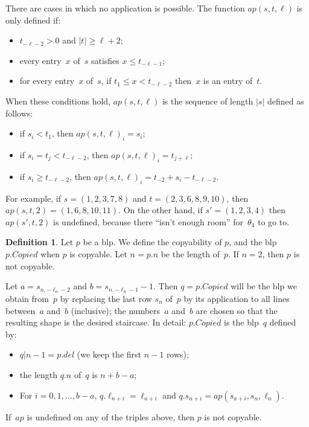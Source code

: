 \documentclass{article}
\theoremstyle{definition}
\newtheorem{definition}[lemma]{Definition}
\theoremstyle{remark}
\begin{document}
There are cases in which no application is possible. The function $ap(s,t,\ell)$ is only defined if:
\begin{itemize}
  \item  $t_{-\ell-2}>0$ and $|t|\ge \ell+2$;
  \item every entry~$x$ of~$s$ satisfies $x\le t_{-\ell-1}$;
  \item for every entry~$x$ of~$s$, if $t_1\le x<t_{-\ell-2}$ then~$x$ is an entry of~$t$. 
\end{itemize}
When these conditions hold, $ap(s,t,\ell)$ is the sequence of length $|s|$ defined as follows:
\begin{itemize}
  \item if $s_i<t_1$, then $ap(s,t,\ell)_i=s_i$;
  \item   if $s_i=t_j<t_{-\ell-2}$, then $ap(s,t,\ell)_i=t_{j+\ell}$; 
  \item if $s_i\ge t_{-\ell-2}$, then $ap(s,t,\ell)_i=t_{-2}+s_i-t_{-\ell-2}$.
\end{itemize}

For example, if $s = (1,2,3,7,8)$ and $t = (2,3,6,8,9,10)$, then $ap(s,t,2) = (1,6,8,10,11)$. On the other hand, if $s' = (1,2,3,4)$ then $ap(s',t,2)$ is undefined, because there ``isn't enough room'' for~$\theta_4$ to go to.

\begin{definition}
    Let $p$ be a blp. We define the copyability of $p$, and the blp $p.Copied$ when $p$ is copyable. Let $n = p.n$ be the length of~$p$. If $n=2$, then $p$ is not copyable.

    Let $a = s_{n, - \ell_n - 2}$ and $b = s_{n, - \ell_n - 1} - 1$. Then $q = p.Copied$ will be the blp we obtain from~$p$ by replacing the last row $s_n$ of~$p$ by its application to all lines between~$a$ and~$b$ (inclusive); the numbers~$a$ and~$b$ are chosen so that the resulting shape is the desired staircase. In detail: $p.Copied$ is the blp~$q$ defined by:

    \begin{itemize}
      \item $q|n-1=p.del$ (we keep the first $n-1$ rows);
      \item the length $q.n$ of~$q$ is $n+b-a$;
      \item For $i=0,1,\dots, b-a$, $q.\ell_{n+i}=\ell_{a+i}$ and $q.s_{n+i}=ap(s_{a+i},s_{n},\ell_n)$. 
    \end{itemize}
    If~$ap$ is undefined on any of the triples above, then $p$ is not copyable. 
\end{definition}
\end{document}
